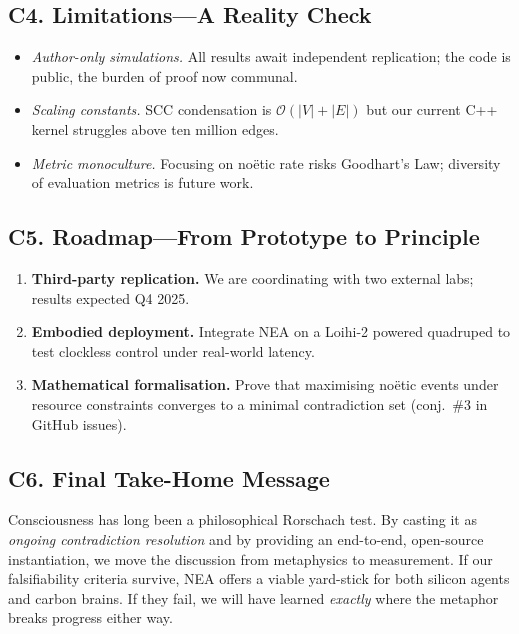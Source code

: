 \documentclass[11pt]{article}
\begin{document}
\begin{enumerate}[itemsep=1pt,label=\textbf{L\arabic*})]
\subsection*{C4. Limitations—A Reality Check}
\begin{itemize}[itemsep=2pt]
  \item \emph{Author-only simulations.}  
        All results await independent replication; the code is
        public, the burden of proof now communal.
  \item \emph{Scaling constants.}  
        SCC condensation is $\mathcal{O}(|V|{+}|E|)$ but our current
        C++ kernel struggles above ten million edges.
  \item \emph{Metric monoculture.}  
        Focusing on no\"etic rate risks Goodhart’s Law; diversity of
        evaluation metrics is future work.
\end{itemize}

\subsection*{C5. Roadmap—From Prototype to Principle}
\begin{enumerate}[label=\textbf{R\arabic*},itemsep=2pt]
  \item \textbf{Third-party replication.}  
        We are coordinating with two external labs; results expected
        Q4 2025.
  \item \textbf{Embodied deployment.}  
        Integrate NEA on a Loihi-2 powered quadruped to test
        clockless control under real-world latency.
  \item \textbf{Mathematical formalisation.}  
        Prove that maximising no\"etic events under resource
        constraints converges to a minimal contradiction set (conj.\
        \#3 in GitHub issues).
\end{enumerate}

\subsection*{C6. Final Take-Home Message}
Consciousness has long been a philosophical Rorschach test.  By
casting it as \emph{ongoing contradiction resolution} and by
providing an end-to-end, open-source instantiation, we move the
discussion from metaphysics to measurement.  
If our falsifiability criteria survive, NEA offers a viable yard-stick
for both silicon agents and carbon brains.  
If they fail, we will have learned \emph{exactly} where the metaphor
breaks progress either way.


\end{enumerate}
\end{document}
